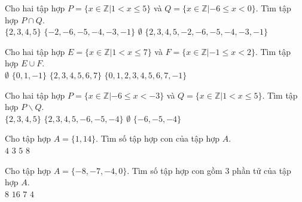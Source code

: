 \documentclass[12pt,a4paper]{article}
\begin{document}
\begin{ex}
 Cho hai tập hợp $P=\{x\in \mathbb{Z}|1 < x \le 5\}$ và $Q=\{x\in \mathbb{Z}|-6 \le x < 0\}$. Tìm tập hợp $P \cap Q$.\\ 
\choice
{ $\{{2, 3, 4, 5}\}$ }
   { $\{{-2, -6, -5, -4, -3, -1}\}$ }
     { \True $\emptyset$ }
    { $\{{2, 3, 4, 5, -2, -6, -5, -4, -3, -1}\}$ }
\end{ex}

\begin{ex}
 Cho hai tập hợp $E=\{x\in \mathbb{Z}|1 < x \le 7\}$ và $F=\{x\in \mathbb{Z}|-1 \le x < 2\}$. Tìm tập hợp $E \cup F$.\\ 
\choice
{ $\emptyset$ }
   { $\{{0, 1, -1}\}$ }
     { $\{{2, 3, 4, 5, 6, 7}\}$ }
    { \True $\{{0, 1, 2, 3, 4, 5, 6, 7, -1}\}$ }
\end{ex}

\begin{ex}
 Cho hai tập hợp $P=\{x\in \mathbb{Z}|-6 \le x < -3\}$ và $Q=\{x\in \mathbb{Z}|1 < x \le 5\}$. Tìm tập hợp $P \backslash Q$.\\ 
\choice
{ $\{{2, 3, 4, 5}\}$ }
   { $\{{2, 3, 4, 5, -6, -5, -4}\}$ }
     { $\emptyset$ }
    { \True $\{{-6, -5, -4}\}$ }
\end{ex}

\begin{ex}
 Cho tập hợp $A=\{{1, 14}\}$. Tìm số tập hợp con của tập hợp ${A}$. \\ 
\choice
{ \True ${4}$ }
   { ${3}$ }
     { ${5}$ }
    { ${8}$ }
\loigiai{ 
  
 }\end{ex}

\begin{ex}
 Cho tập hợp $A=\{{-8, -7, -4, 0}\}$. Tìm số tập hợp con gồm 3 phần tử của tập hợp ${A}$. \\ 
\choice
{ ${8}$ }
   { ${16}$ }
     { ${7}$ }
    { \True ${4}$ }
\loigiai{ 
  
 }\end{ex}
\end{document}
